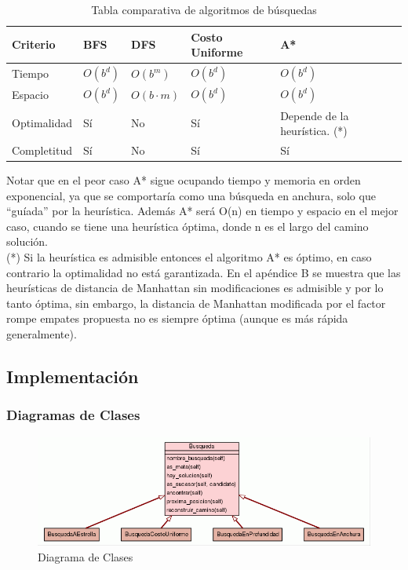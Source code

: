 \documentclass[letter, titlepage, 10pt]{article}
\begin{document}
\begin{table}[H]
\begin{center}

\begin{tabular}{|l|l|l|l|l|}
\hline
\textbf{Criterio} & \textbf{BFS}           & \textbf{DFS}           & \textbf{Costo Uniforme} & \textbf{A*}               \\ \hline
Tiempo            & $O(b^d)$ & $O(b^m)$ & $O(b^d)$  & $O(b^d)$    \\ \hline
Espacio           & $O(b^d)$ & $O(b\cdot m)$            & $O(b^d)$  & $O(b^d)$    \\ \hline
Optimalidad       & Sí                     & No                     & Sí                      & Depende de la heurística. {\small(*)} \\ \hline
Completitud       & Sí                     & No                     & Sí                      & Sí                        \\ \hline
\end{tabular}
\caption{Tabla comparativa de algoritmos de búsquedas}
\end{center}

\end{table}

Notar que en el peor caso A* sigue ocupando tiempo y memoria en orden exponencial, ya que se comportaría como una búsqueda en anchura, solo que ``guíada'' por la heurística. 
Además A* será O(n) en tiempo y espacio en el mejor caso, cuando se tiene una heurística óptima, donde n es el largo del camino solución.\\

{\small(*)} Si la heurística es admisible entonces el algoritmo A* es óptimo, en caso contrario la optimalidad no está garantizada. En el apéndice B se muestra que las heurísticas de distancia de Manhattan sin modificaciones es admisible y por lo tanto óptima, sin embargo, la distancia de Manhattan modificada por el factor rompe empates propuesta no es siempre óptima (aunque es más rápida generalmente).

\newpage
\subsection{Implementación}
\subsubsection{Diagramas de Clases}
\begin{figure}[ht]
    \begin{center}
        \includegraphics[scale = 0.5]{images/diagram_busq}
        \caption{Diagrama de Clases}
    \end{center}
\end{figure}
\end{document}
